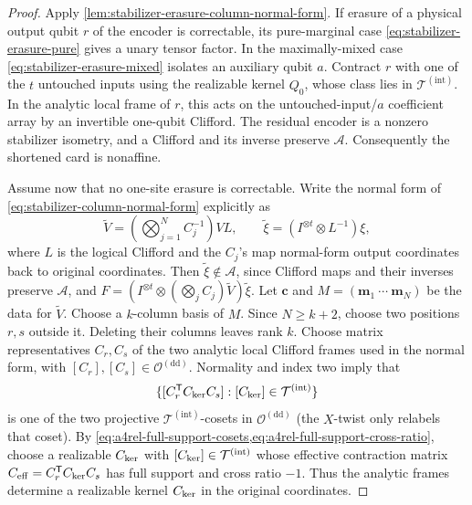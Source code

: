 \documentclass[11pt,letterpaper,onecolumn]{article}
\theoremstyle{plain}
\theoremstyle{definition}
\theoremstyle{remark}
\newcommand{\cA}{\mathscr A}
\newcommand{\TetInt}{{\mathcal T^{(\mathrm{int})}}}
\newcommand{\OctDD}{{\mathcal O^{(\mathrm{dd})}}}
\begin{document}
\begin{proof}
Apply \cref{lem:stabilizer-erasure-column-normal-form}.  If erasure of a
physical output qubit \(r\) of the encoder is correctable, its pure-marginal case
\cref{eq:stabilizer-erasure-pure} gives a unary tensor factor.  In the
maximally-mixed case \cref{eq:stabilizer-erasure-mixed} isolates an
auxiliary qubit \(a\).  Contract \(r\) with one of the \(t\) untouched
inputs using the realizable kernel \(Q_0\), whose class lies in
\(\TetInt\).  In the analytic local
frame of \(r\), this acts on the untouched-input/\(a\) coefficient array by
an invertible one-qubit Clifford.  The residual encoder is a nonzero
stabilizer isometry, and a Clifford and its inverse preserve \(\cA\).
Consequently the shortened card is nonaffine.

Assume now that no one-site erasure is correctable.  Write the normal
form of \cref{eq:stabilizer-column-normal-form} explicitly as
\[
 \widetilde V=\left(\bigotimes_{j=1}^N C_j^{-1}\right)VL,
 \qquad
 \widetilde\xi=(I^{\otimes t}\otimes L^{-1})\xi,
\]
where \(L\) is the logical Clifford and the \(C_j\)'s map normal-form
output coordinates back to original coordinates.  Then
\(\widetilde\xi\notin\cA\), since Clifford maps and their inverses
preserve \(\cA\), and
\(F=(I^{\otimes t}\otimes(\bigotimes_jC_j)\widetilde V)
\widetilde\xi\).  Let \({\mathbf{c}}\) and \(M=({\mathbf{m}}_1\ \cdots\ {\mathbf{m}}_N)\) be the
data for \(\widetilde V\).  Choose a \(k\)-column basis of
\(M\).  Since \(N\ge k+2\), choose two positions \(r,s\) outside it. Deleting
their columns leaves rank \(k\).  Choose matrix representatives \(C_r,C_s\)
of the two analytic local Clifford frames used in the normal form, with
\([C_r],[C_s]\in\OctDD\).  Normality and
index two imply that
\begin{equation*}
 \{[C_r^{\mathsf T}C_{\rm ker}C_s]:[C_{\rm ker}]\in\TetInt\}
\end{equation*}
is one of the two projective \(\TetInt\)-cosets in \(\OctDD\)
(the \(X\)-twist only relabels that coset).  By
\cref{eq:a4rel-full-support-cosets,eq:a4rel-full-support-cross-ratio}, choose
a realizable \(C_{\rm ker}\) with \([C_{\rm ker}]\in\TetInt\) whose effective contraction matrix
\(C_{\rm eff}=C_r^{\mathsf T}C_{\rm ker}C_s\) has full support and cross ratio
\(-1\).  Thus the analytic frames determine a realizable kernel \(C_{\rm ker}\) in the
original coordinates.


\end{proof}
\end{document}
